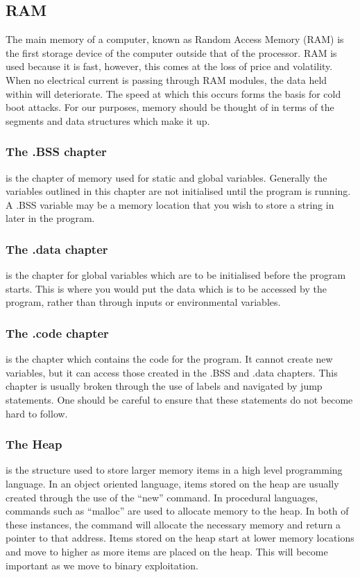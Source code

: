 \documentclass[a4paper,11pt]{book}
\begin{document}
				\subsection{RAM}
					The main memory of a computer, known as Random Access Memory (RAM) is the first storage device of the computer outside that of the processor. 
					RAM is used because it is fast, however, this comes at the loss of price and volatility. 
					When no electrical current is passing through RAM modules, the data held within will deteriorate. 
					The speed at which this occurs forms the basis for cold boot attacks. %
					For our purposes, memory should be thought of in terms of the segments and data structures which make it up. 
					\subsubsection{The .BSS chapter}
						is the chapter of memory used for static and global variables. 
						Generally the variables outlined in this chapter are not initialised until the program is running. 
						A .BSS variable may be a memory location that you wish to store a string in later in the program. 
					\subsubsection{The .data chapter}
						is the chapter for global variables which are to be initialised before the program starts. 
						This is where you would put the data which is to be accessed by the program, rather than through inputs or environmental variables. 
					\subsubsection{The .code chapter}
						is the chapter which contains the code for the program. 
						It cannot create new variables, but it can access those created in the .BSS and .data chapters. 
						This chapter is usually broken through the use of labels and navigated by jump statements. 
						One should be careful to ensure that these statements do not become hard to follow. 
					\subsubsection{The Heap}
						is the structure used to store larger memory items in a high level programming language. 
						In an object oriented language, items stored on the heap are usually created through the use of the ``new'' command. 
						In procedural languages, commands such as ``malloc'' are used to allocate memory to the heap. 
						In both of these instances, the command will allocate the necessary memory and return a pointer to that address. 
						Items stored on the heap start at lower memory locations and move to higher as more items are placed on the heap. 
						This will become important as we move to binary exploitation. 
\end{document}

